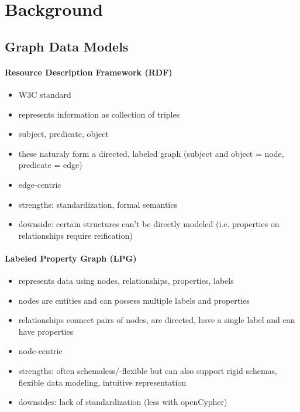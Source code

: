 \documentclass[sigconf,authordraft]{acmart}
\begin{document}
\section{Background}

\subsection{Graph Data Models}

\paragraph{Resource Description Framework (RDF)}
\begin{itemize}
	\item W3C standard
	\item represents information as collection of triples
	\item subject, predicate, object
	\item these naturaly form a directed, labeled graph (subject and object = node,
	      predicate = edge)
	\item edge-centric

	\item strengths: standardization, formal semantics
	\item downside: certain structures can't be directly modeled (i.e. properties on
	      relationships require reification)
\end{itemize}

\paragraph{Labeled Property Graph (LPG)}
\begin{itemize}
	\item represents data using nodes, relationships, properties, labels
	\item nodes are entities and can possess multiple labels and properties
	\item relationships connect pairs of nodes, are directed, have a single label and can have properties
	\item node-centric

	\item strengths: often schemaless/-flexible but can also support rigid
	      schemas, flexible data modeling, intuitive representation
	\item downsides: lack of standardization (less with openCypher)
\end{itemize}
\end{document}
